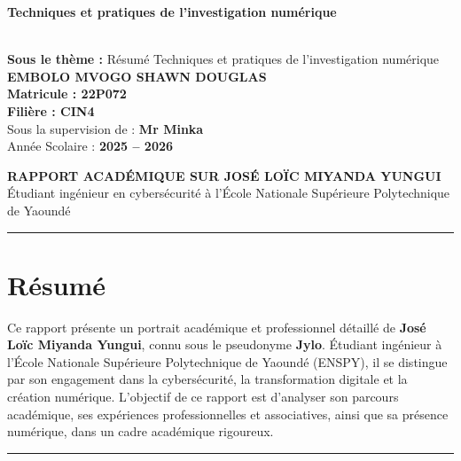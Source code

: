 \documentclass[12pt]{article}
\begin{document}
\vspace{2cm}

\begin{center} 
	\colorbox{orange!80}{
        \parbox{\dimexpr\textwidth-4\fboxsep}{
            \centering
            {\LARGE \textbf{Techniques et pratiques de l'investigation numérique}}
        }
    }\\[0.8cm]
    {\large \textbf{Sous le thème :} Résumé Techniques et pratiques de l'investigation numérique}\\[1.5cm]

    \textbf{{EMBOLO MVOGO SHAWN DOUGLAS}}\\[0.8cm]
    \textbf{{Matricule : 22P072}}\\[0.8cm]
    \textbf{{Filière : CIN4}}\\[0.8cm]
    Sous la supervision de : \textbf{Mr Minka}\\[1.5cm]

    Année Scolaire : \textbf{2025 -- 2026}
\end{center}


\newpage
\setcounter{page}{1}

\newpage

\begin{center}
\Large\textbf{RAPPORT ACADÉMIQUE SUR JOSÉ LOÏC MIYANDA YUNGUI}\\[0.4cm]
\large Étudiant ingénieur en cybersécurité à l’École Nationale Supérieure Polytechnique de Yaoundé
\end{center}

\hrule
\vspace{0.5cm}

\section*{Résumé}
Ce rapport présente un portrait académique et professionnel détaillé de \textbf{José Loïc Miyanda Yungui}, connu sous le pseudonyme \textbf{Jylo}. Étudiant ingénieur à l’École Nationale Supérieure Polytechnique de Yaoundé (ENSPY), il se distingue par son engagement dans la cybersécurité, la transformation digitale et la création numérique.  
L’objectif de ce rapport est d’analyser son parcours académique, ses expériences professionnelles et associatives, ainsi que sa présence numérique, dans un cadre académique rigoureux.

\vspace{0.5cm}
\hrule
\vspace{0.5cm}
\end{document}
